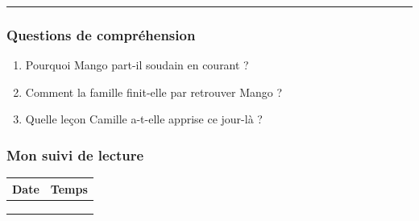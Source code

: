 \documentclass[
  french,
  french,
  14pt,
  a4paper]{extarticle}
\providecommand{\tightlist}{%
  \setlength{\itemsep}{0pt}\setlength{\parskip}{0pt}}
\begin{document}
{\begin{center}\rule{0.5\linewidth}{0.5pt}\end{center}

\subsubsection{Questions de
compréhension}\label{questions-de-compruxe9hension-9}

\begin{enumerate}
\def\labelenumi{\arabic{enumi}.}
\tightlist
\item
  Pourquoi Mango part-il soudain en courant ?
\item
  Comment la famille finit-elle par retrouver Mango ?
\item
  Quelle leçon Camille a-t-elle apprise ce jour-là ?
\end{enumerate}

\subsubsection{Mon suivi de lecture}\label{mon-suivi-de-lecture-9}

\begin{center}
\begin{tabularx}{\textwidth}{|X|X|}
\hline
\textbf{Date} & \textbf{Temps} \\
\hline
& \\
\hline
& \\
\hline
& \\
\hline
\end{tabularx}
\end{center}

}%
\newpage
\end{document}

